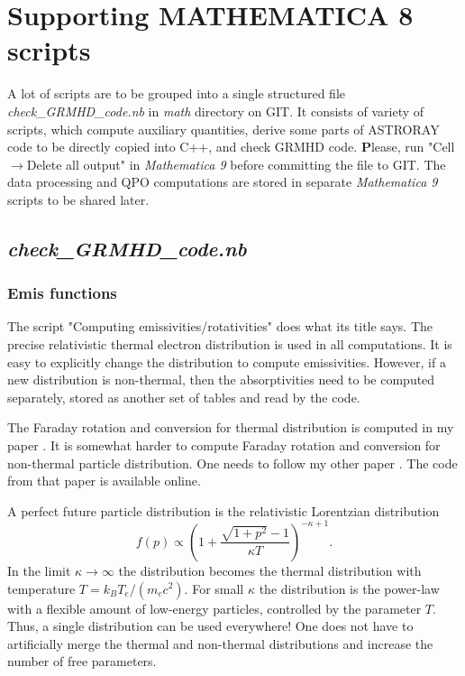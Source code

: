 \documentclass{emulateapj}
\newcommand{\mat}{\textit{Mathematica 9 }}
\begin{document}
\section{Supporting MATHEMATICA 8 scripts}
A lot of scripts are to be grouped into a single structured file
\textit{check\_GRMHD\_code.nb} in \textit{math} directory on GIT.  It
consists of variety of scripts, which compute auxiliary quantities,
derive some parts of ASTRORAY code to be directly copied into C++, and
check GRMHD code.  {\textbf Please, run "Cell$\rightarrow$Delete all
  output" in \mat before committing the file to GIT.}  The data
processing and QPO computations are stored in separate \mat scripts to
be shared later.
\subsection{\textit{check\_GRMHD\_code.nb}}
\subsubsection{Emis functions}
The script "Computing emissivities/rotativities" does what its title
says. The precise relativistic thermal electron distribution is used
in all computations.  It is easy to explicitly change the distribution
to compute emissivities. However, if a new distribution is
non-thermal, then the absorptivities need to be computed separately,
stored as another set of tables and read by the code.

The Faraday rotation and conversion for thermal distribution is
computed in my paper \citep{Shcherbakov:2008fa}.  It is somewhat
harder to compute Faraday rotation and conversion for non-thermal
particle distribution.  One needs to follow my other paper
\citet{Huang:2011de}. The code from that paper is available online.

A perfect future particle distribution is the relativistic Lorentzian
distribution \citep{Shcherbakov:2009po}
\begin{equation}
f(p)\propto\left(1+\frac{\sqrt{1+p^2}-1}{\kappa T}\right)^{-\kappa+1}.
\end{equation} 
In the limit $\kappa\rightarrow\infty$ the distribution becomes the
thermal distribution with temperature $T=k_B T_e/(m_e c^2)$.  For
small $\kappa$ the distribution is the power-law with a flexible
amount of low-energy particles, controlled by the parameter $T$.
Thus, a single distribution can be used everywhere! One does not have
to artificially merge the thermal and non-thermal distributions and
increase the number of free parameters.
\end{document}
